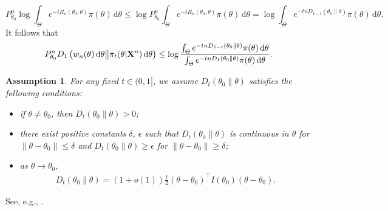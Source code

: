 \documentclass[11pt]{article}
\theoremstyle{plain}
\newtheorem{assumption}{\quad\quad Assumption}
\theoremstyle{definition}
\theoremstyle{remark}
\begin{document}
\begin{appendices}
\begin{equation*}
    P_{\theta_0}^n \log \int_{\Theta} e^{-t R_n (\theta_0, \theta)} \pi (\theta) \, \mathrm d \theta  
    \leq
    \log 
    P_{\theta_0}^n
    \int_{\Theta} e^{-t R_n (\theta_0, \theta)} \pi (\theta) \, \mathrm d \theta  
    =
    \log 
    \int_{\Theta} e^{-tn D_{1-t}(\theta_0 \| \theta)} \pi (\theta) \, \mathrm d \theta.
\end{equation*}
It follows that
\begin{align*}
    P_{\theta_0}^n
     D_1\left( 
        w_n (\theta) \, \mathrm d \theta
        \big\|
        \pi_t (\theta | \mathbf{X}^{n}) \, \mathrm d \theta
    \right)
    \leq
    \log \frac{
        \int_{\Theta} e^{-tn D_{1-t}(\theta_0 \| \theta)} \pi (\theta) \, \mathrm d \theta
    }
    {
    \int_{\Theta} e^{-tn D_{1}(\theta_0 \| \theta)} \pi (\theta) \, \mathrm d \theta
}.
\end{align*}


\begin{assumption}
    For any fixed $t \in (0,1]$,
    we assume $D_t\left( \theta_0 \| \theta \right)$ satisfies the following conditions:
    \begin{itemize}
        \item 
    if $\theta \neq \theta_0$, then $D_t (\theta_0 \| \theta)>0$;
\item
    there exist positive constants $\delta$, $\epsilon$ such that $D_t\left( \theta_0 \| \theta \right)$ is continuous in $\theta$ for $\|\theta-\theta_0\| \leq \delta$ and $D_t (\theta_0 \| \theta)\geq \epsilon$ for $\|\theta - \theta_0\| \geq \delta$;
\item
    as $\theta \to \theta_0$, 
    \begin{align*}
    D_t(\theta_0 \| \theta) = (1+o(1))\frac{t}{2} (\theta -\theta_0)^\top I(\theta_0) (\theta - \theta_0).
    \end{align*}
    \end{itemize}
    \label{assumption2019}
\end{assumption}

See, e.g., \cite{Erven2014}.



\end{appendices}
\end{document}
